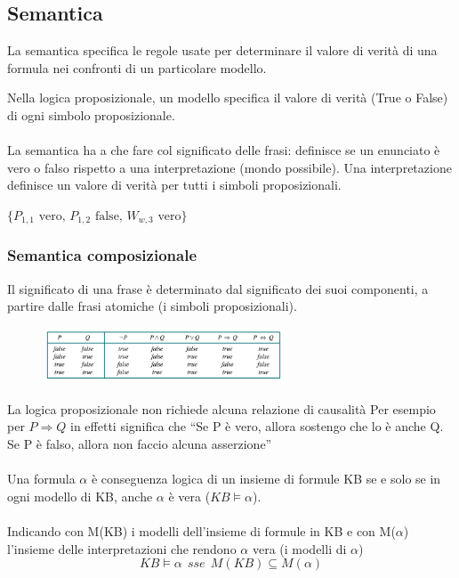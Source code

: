 \subsection{Semantica}
\begin{definition}
    La semantica specifica le regole usate per determinare il valore di verità di una formula nei confronti di un particolare modello.
\end{definition}
\hspace{-15pt}Nella logica proposizionale, un modello specifica il
valore di verità (True o False) di ogni simbolo proposizionale.\\\\
La semantica ha a che fare col significato delle frasi: definisce se un enunciato
è vero o falso rispetto a una interpretazione (mondo possibile). Una interpretazione definisce un valore di verità per tutti i simboli proposizionali.
\begin{example}
    $\{P_{1,1} \text{ vero, } P_{1,2} \text{ false, } W_{w,3} \text{ vero}\}$
\end{example}
\subsubsection{Semantica composizionale}
Il significato di una frase è determinato dal significato dei suoi componenti, a partire dalle frasi atomiche (i simboli proposizionali).
\begin{figure}[h!]
    \centering
    \includegraphics[width=0.65\textwidth]{images/tavola-vertià.png}
\end{figure}

\hspace{-15pt}La logica proposizionale non richiede alcuna relazione di causalità 
Per esempio per $P \Rightarrow Q$ in effetti significa che “Se P è vero, allora sostengo che lo è anche Q. Se P è falso, allora non faccio alcuna asserzione”\\\\
Una formula $\alpha$ è conseguenza logica di un insieme di
formule KB se e solo se in ogni modello di KB, anche $\alpha$
è vera ($KB \models \alpha$).\\\\
Indicando con M(KB) i modelli dell’insieme di formule
in KB e con M($\alpha$) l’insieme delle interpretazioni che
rendono $\alpha$ vera (i modelli di $\alpha$)
$$KB \models \alpha \:\: sse \:\: M(KB) \subseteq M(\alpha)$$

